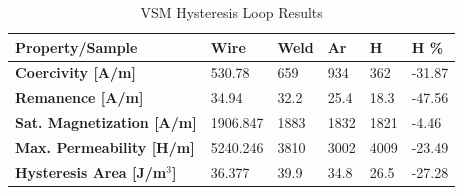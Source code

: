 \begin{table}[ht]
\centering
\caption{VSM Hysteresis Loop Results}
\label{tab:mag_data}
\begin{tabular}{|l|l|l|l|l|l|}
\hline
\textbf{Property/Sample} & \textbf{Wire} & \textbf{Weld} & \textbf{Ar} & \textbf{H} & \textbf{H \%} \\ \hline
\textbf{Coercivity [A/m]}         & 530.78   & 659  & 934  & 362  & -31.87 \\ \hline
\textbf{Remanence [A/m]}          & 34.94    & 32.2 & 25.4 & 18.3 & -47.56 \\ \hline
\textbf{Sat. Magnetization [A/m]} & 1906.847 & 1883 & 1832 & 1821 & -4.46  \\ \hline
\textbf{Max. Permeability [H/m]}  & 5240.246 & 3810 & 3002 & 4009 & -23.49 \\ \hline
\textbf{Hysteresis Area [J/m$^3$]}  & 36.377   & 39.9 & 34.8 & 26.5 & -27.28 \\ \hline
\end{tabular}
\end{table}

